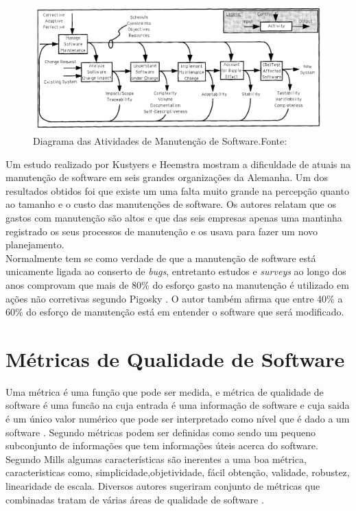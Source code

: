 \graphicspath{{figuras/}}
\begin{figure}
\centering
\includegraphics[scale=0.50]{Manutencao}
\caption{Diagrama das Atividades de Manutenção de Software.Fonte:\cite{pfleeger_framework_1990}}
\label{img:modelo_manutencao}
\end{figure}
Um estudo realizado por Kustyers e Heemstra \cite{kusters} mostram a dificuldade de atuais na manutenção de software em seis grandes organizações da Alemanha. Um dos resultados obtidos foi que existe um uma falta muito grande na percepção quanto ao tamanho e o custo das manutenções de software. Os autores relatam que os gastos com manutenção são altos e que das seis empresas apenas uma mantinha registrado os seus processos de manutenção e os usava para fazer um novo planejamento. 
\\Normalmente tem se como verdade de que a manutenção de software está unicamente ligada ao conserto de \textit{bugs}, entretanto estudos e \textit{surveys} ao longo dos anos comprovam que mais de 80\% do esforço gasto na manutenção é utilizado em ações não corretivas segundo Pigosky \cite{pigosky}. O autor também afirma que entre 40\% a 60\% do esforço de manutenção está em entender o software que será modificado.

\section{Métricas de Qualidade de Software}
Uma métrica é uma função que pode ser medida, e métrica de qualidade de software é uma funcão na cuja entrada é uma informação de software e cuja saida é um único valor numérico que pode ser interpretado como nível que é dado a um software \cite{karner}. Segundo \cite{pressman} métricas podem ser definidas como sendo um pequeno subconjunto de informações que tem informações úteis acerca do software.
Segundo Mills algumas características são inerentes a uma boa métrica, caracteristicas como, simplicidade,objetividade, fácil obtenção, validade, robustez, linearidade de escala. Diversos autores sugeriram conjunto de métricas que combinadas tratam de várias áreas de qualidade de software \cite{paulo_meirelles}.

